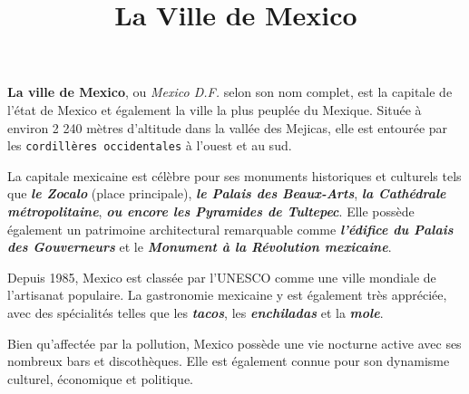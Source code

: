 \documentclass[12pt, a4paper]{article}
\title{La Ville de Mexico}
\author{}
\date{}
\begin{document}
   \maketitle

\textbf{La ville de Mexico}, ou \textit{Mexico D.F.} selon son nom complet, est la capitale de l'état de Mexico et également la ville la plus peuplée du Mexique. Située à environ 2 240 mètres d'altitude dans la vallée des Mejicas, elle est entourée par les \texttt{cordillères occidentales} à l'ouest et au sud.

La capitale mexicaine est célèbre pour ses monuments historiques et culturels tels que \textbf{\textit{le Zocalo}} (place principale), \textbf{\textit{le Palais des Beaux-Arts}}, \textbf{\textit{la Cathédrale métropolitaine}}, \textbf{\textit{ou encore les Pyramides de Tultepec}}. Elle possède également un patrimoine architectural remarquable comme \textbf{\textit{l'édifice du Palais des Gouverneurs}} et le \textbf{\textit{Monument à la Révolution mexicaine}}.

Depuis 1985, Mexico est classée par l'UNESCO comme une ville mondiale de l'artisanat populaire. La gastronomie mexicaine y est également très appréciée, avec des spécialités telles que les \textbf{\textit{tacos}}, les \textbf{\textit{enchiladas}} et la \textbf{\textit{mole}}.

Bien qu'affectée par la pollution, Mexico possède une vie nocturne active avec ses nombreux bars et discothèques. Elle est également connue pour son dynamisme culturel, économique et politique.



  
\end{document}
